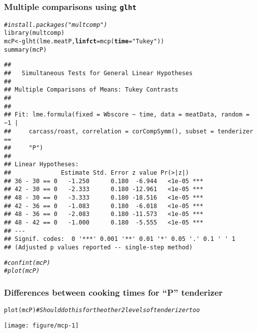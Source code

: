 \documentclass[color=usenames,dvipsnames]{beamer}\usepackage[]{graphicx}\usepackage[]{color}
\makeatletter
\newcommand{\hlstr}[1]{\textcolor[rgb]{0.749,0.012,0.012}{#1}}%
\newcommand{\hlcom}[1]{\textcolor[rgb]{0.514,0.506,0.514}{\textit{#1}}}%
\newcommand{\hlstd}[1]{\textcolor[rgb]{0,0,0}{#1}}%
\newcommand{\hlkwb}[1]{\textcolor[rgb]{0,0.341,0.682}{#1}}%
\newcommand{\hlkwc}[1]{\textcolor[rgb]{0,0,0}{\textbf{#1}}}%
\newcommand{\hlkwd}[1]{\textcolor[rgb]{0.004,0.004,0.506}{#1}}%
\newenvironment{kframe}{%
 \def\at@end@of@kframe{}%
 \ifinner\ifhmode%
  \def\at@end@of@kframe{\end{minipage}}%
  \begin{minipage}{\columnwidth}%
 \fi\fi%
 \def\FrameCommand##1{\hskip\@totalleftmargin \hskip-\fboxsep
 \colorbox{shadecolor}{##1}\hskip-\fboxsep
     \hskip-\linewidth \hskip-\@totalleftmargin \hskip\columnwidth}%
 \MakeFramed {\advance\hsize-\width
   \@totalleftmargin\z@ \linewidth\hsize
   \@setminipage}}%
 {\par\unskip\endMakeFramed%
 \at@end@of@kframe}
\newenvironment{knitrout}{}{} %
\newcommand{\inr}[1]{\colorbox{inlinecolor}{\texttt{#1}}}
\makeatother
\begin{document}
\begin{frame}[fragile]
  \frametitle{Multiple comparisons using {\tt glht}}
\scriptsize %
\begin{knitrout}\tiny
{}\color{fgcolor}\begin{kframe}
\begin{alltt}
\hlcom{# install.packages("multcomp")}
\hlkwd{library}\hlstd{(multcomp)}
\hlstd{mcP} \hlkwb{<-} \hlkwd{glht}\hlstd{(lme.meatP,} \hlkwc{linfct}\hlstd{=}\hlkwd{mcp}\hlstd{(}\hlkwc{time}\hlstd{=}\hlstr{"Tukey"}\hlstd{))}
\hlkwd{summary}\hlstd{(mcP)}
\end{alltt}
\begin{verbatim}
## 
## 	 Simultaneous Tests for General Linear Hypotheses
## 
## Multiple Comparisons of Means: Tukey Contrasts
## 
## 
## Fit: lme.formula(fixed = Wbscore ~ time, data = meatData, random = ~1 | 
##     carcass/roast, correlation = corCompSymm(), subset = tenderizer == 
##     "P")
## 
## Linear Hypotheses:
##              Estimate Std. Error z value Pr(>|z|)    
## 36 - 30 == 0   -1.250      0.180  -6.944   <1e-05 ***
## 42 - 30 == 0   -2.333      0.180 -12.961   <1e-05 ***
## 48 - 30 == 0   -3.333      0.180 -18.516   <1e-05 ***
## 42 - 36 == 0   -1.083      0.180  -6.018   <1e-05 ***
## 48 - 36 == 0   -2.083      0.180 -11.573   <1e-05 ***
## 48 - 42 == 0   -1.000      0.180  -5.555   <1e-05 ***
## ---
## Signif. codes:  0 '***' 0.001 '**' 0.01 '*' 0.05 '.' 0.1 ' ' 1
## (Adjusted p values reported -- single-step method)
\end{verbatim}
\begin{alltt}
\hlcom{# confint(mcP)}
\hlcom{# plot(mcP)}
\end{alltt}
\end{kframe}
\end{knitrout}
\end{frame}



\begin{frame}[fragile]
  \frametitle{\small Differences between cooking times for ``P'' tenderizer}
  \centering %
\begin{knitrout}\scriptsize
{}\color{fgcolor}\begin{kframe}
\begin{alltt}
\hlkwd{plot}\hlstd{(mcP)} \hlcom{# Should do this for the other 2 levels of tenderizer too}
\end{alltt}
\end{kframe}
\end{knitrout}
\texttt{[image: figure/mcp-1]} \\
\end{frame}
\end{document}
